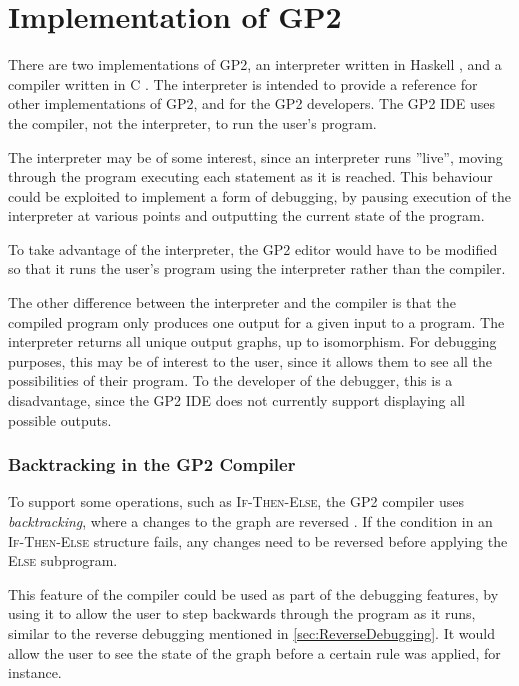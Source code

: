 \documentclass[authoryearcitations]{UoYCSproject}
\begin{document}

\section{Implementation of GP2}
\label{sec:ImplementationOfGP2}

There are two implementations of GP2, an interpreter written in Haskell
\citep[ch. 5.3]{bak2015}, and a compiler written in C \citep[ch. 5.5]{bak2015}.
The interpreter is intended to provide a reference for other implementations of
GP2, and for the GP2 developers. The GP2 IDE uses the compiler, not the
interpreter, to run the user's program.

The interpreter may be of some interest, since an interpreter runs ''live'',
moving through the program executing each statement as it is reached. This
behaviour could be exploited to implement a form of debugging, by pausing
execution of the interpreter at various points and outputting the current state
of the program.

To take advantage of the interpreter, the GP2 editor would have to be modified
so that it runs the user's program using the interpreter rather than the compiler.

The other difference between the interpreter and the compiler is that the compiled
program only produces one output for a given input to a program. The interpreter
returns all unique output graphs, up to isomorphism. For debugging purposes, this
may be of interest to the user, since it allows them to see all the possibilities
of their program. To the developer of the debugger, this is a disadvantage, since
the GP2 IDE does not currently support displaying all possible outputs.

\subsubsection{Backtracking in the GP2 Compiler}
\label{sec:BacktrackingInTheGP2Compiler}

To support some operations, such as \textsc{If-Then-Else}, the GP2 compiler uses
\emph{backtracking}, where a changes to the graph are reversed \citep[ch. 5.8]{bak2015}.
If the condition in an \textsc{If-Then-Else} structure fails, any changes need
to be reversed before applying the \textsc{Else} subprogram.

This feature of the compiler could be used as part of the debugging features,
by using it to allow the user to step backwards through the program as it runs,
similar to the reverse debugging mentioned in \autoref{sec:ReverseDebugging}. It
would allow the user to see the state of the graph before a certain rule was
applied, for instance.
\end{document}
